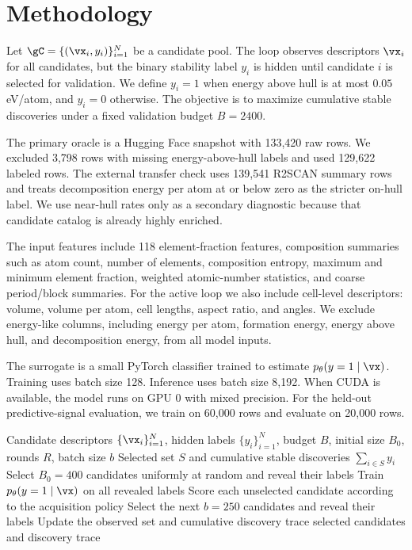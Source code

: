\section{Methodology}
\label{sec:methodology}

Let $\gC=\{(\vx_i, y_i)\}_{i=1}^{N}$ be a candidate pool. The loop observes descriptors $\vx_i$ for all candidates, but the binary stability label $y_i$ is hidden until candidate $i$ is selected for validation. We define $y_i=1$ when energy above hull is at most $0.05$ eV/atom, and $y_i=0$ otherwise. The objective is to maximize cumulative stable discoveries under a fixed validation budget $B=2400$.

The primary oracle is a Hugging Face \mpdata snapshot with 133,420 raw rows. We excluded 3,798 rows with missing energy-above-hull labels and used 129,622 labeled rows. The external transfer check uses 139,541 \gnome R2SCAN summary rows and treats decomposition energy per atom at or below zero as the stricter on-hull label. We use \gnome near-hull rates only as a secondary diagnostic because that candidate catalog is already highly enriched.

The input features include 118 element-fraction features, composition summaries such as atom count, number of elements, composition entropy, maximum and minimum element fraction, weighted atomic-number statistics, and coarse period/block summaries. For the \mpdata active loop we also include cell-level descriptors: volume, volume per atom, cell lengths, aspect ratio, and angles. We exclude energy-like columns, including energy per atom, formation energy, energy above hull, and decomposition energy, from all model inputs.

The surrogate is a small PyTorch \mlp classifier trained to estimate $p_{\theta}(y=1 \mid \vx)$. Training uses batch size 128. Inference uses batch size 8,192. When CUDA is available, the model runs on GPU 0 with mixed precision. For the held-out predictive-signal evaluation, we train on 60,000 rows and evaluate on 20,000 rows.

\begin{algorithm}[t]
\caption{\methodname active-discovery loop}
\label{alg:atomic_loop}
\begin{algorithmic}[1]
\Require Candidate descriptors $\{\vx_i\}_{i=1}^{N}$, hidden labels $\{y_i\}_{i=1}^{N}$, budget $B$, initial size $B_0$, rounds $R$, batch size $b$
\Ensure Selected set $S$ and cumulative stable discoveries $\sum_{i \in S} y_i$
\State Select $B_0=400$ candidates uniformly at random and reveal their labels
    \State Train $p_{\theta}(y=1 \mid \vx)$ on all revealed labels
    \State Score each unselected candidate according to the acquisition policy
    \State Select the next $b=250$ candidates and reveal their labels
    \State Update the observed set and cumulative discovery trace
\EndFor
\State \Return selected candidates and discovery trace
\end{algorithmic}
\end{algorithm}

